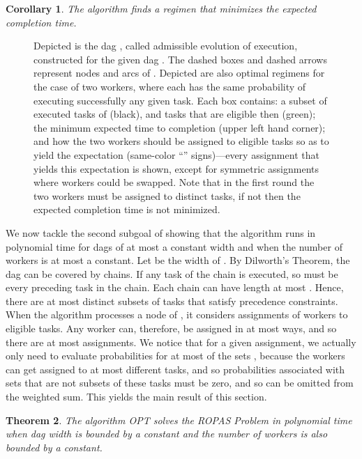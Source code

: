 \documentclass[letterpaper,11pt]{article}
\newtheorem{theorem}{Theorem}[section]
\newtheorem{corollary}[theorem]{Corollary}
\begin{document}
\begin{corollary}
\label{dp.correctness}
The algorithm  finds a regimen  that minimizes the expected completion time.
\end{corollary}


\begin{figure*}[ht!]
\centerline{}
\caption{Depicted is the dag , called admissible evolution of execution, constructed for the given dag . The dashed boxes and dashed arrows represent nodes and arcs of . Depicted are also optimal regimens for the case of two workers, where each has the same probability  of executing successfully any given task. Each box contains: a subset of executed tasks of  (black), and tasks that are eligible then (green); the minimum expected time to completion (upper left hand corner); and how the two workers should be assigned to eligible tasks so as to yield the expectation (same-color ``'' signs)---every assignment that yields this expectation is shown, except for symmetric assignments where workers could be swapped. Note that in the first round the two workers must be assigned to distinct tasks, if not then the expected completion time is not minimized.
\label{f.aec}}
\end{figure*}


We now tackle the second subgoal of showing that the algorithm runs in polynomial time for dags of at most a constant width and when the number of workers is at most a constant.
Let  be the width of . By Dilworth's Theorem, the dag  can be covered by  chains. If any task of the chain is executed, so must be every preceding task in the chain. Each chain can have length at most . Hence, there are at most  distinct subsets of tasks that satisfy precedence constraints. 
When the algorithm processes a node of , it considers assignments of workers to eligible tasks. Any worker can, therefore, be assigned in at most  ways, and so there are at most  assignments. We notice that for a given assignment, we actually only need to evaluate probabilities  for at most  of the sets , because the workers can get assigned to at most  different tasks, and so probabilities associated with sets that are not subsets of these tasks must be zero, and so can be omitted from the weighted sum. This yields the main result of this section.



\begin{theorem}
\label{dp.final}
The algorithm OPT solves the ROPAS Problem in polynomial time when dag width is bounded by a constant and the number of workers is also bounded by a constant.
\end{theorem}
\end{document}
